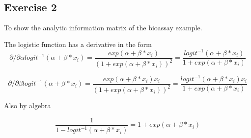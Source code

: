 \documentclass[
]{book}
\theoremstyle{definition}
\theoremstyle{definition}
\theoremstyle{definition}
\theoremstyle{definition}
\theoremstyle{remark}
\begin{document}
\hypertarget{exercise-2}{%
\subsection*{Exercise 2}\label{exercise-2}}

To show the analytic information matrix of the bioassay example.

The logistic function has a derivative in the form
\begin{equation}
\partial/\partial\alpha logit^{-1}(\alpha+\beta*x_i) = \frac{exp(\alpha+\beta*x_i)}{(1+exp(\alpha+\beta*x_i))^2}=\frac{logit^{-1}(\alpha+\beta*x_i)}{1+exp(\alpha+\beta*x_i)}
\end{equation}

\begin{equation}
\partial/\partial\beta logit^{-1}(\alpha+\beta*x_i) = \frac{exp(\alpha+\beta*x_i)x_i}{(1+exp(\alpha+\beta*x_i))^2}=\frac{logit^{-1}(\alpha+\beta*x_i)x_i}{1+exp(\alpha+\beta*x_i)}
\end{equation}

Also by algebra

\begin{equation}
\frac{1}{1-logit^{-1}(\alpha+\beta*x_i)} = 1+exp(\alpha+\beta*x_i)
\end{equation}
\end{document}
